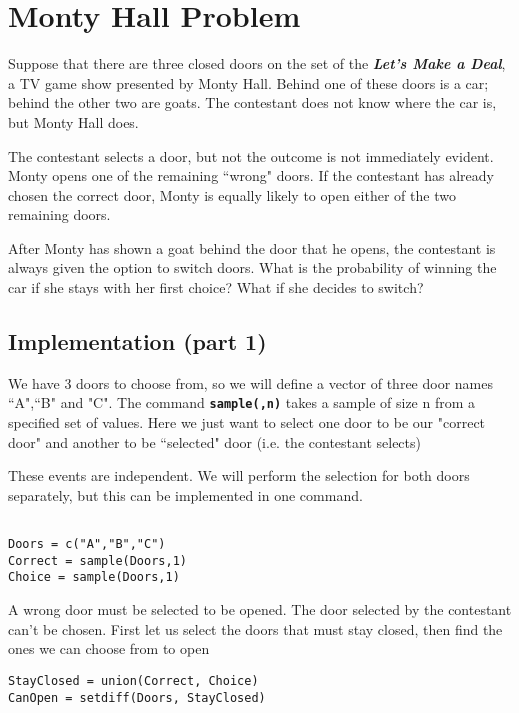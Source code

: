 \documentclass[a4paper,12pt]{article}
\begin{document}
\section{Monty Hall Problem}
Suppose that there are three closed doors on the set of the  \textbf{\emph{Let's Make a Deal}}, a TV game show presented by Monty Hall. Behind one of these doors is a car; behind the other two are goats. The contestant does not know where the car is, but Monty Hall does.

The contestant selects a door, but not the outcome is not immediately evident. Monty opens one of the remaining ``wrong" doors. If the contestant has already chosen the correct door, Monty is equally likely to open either of the two remaining doors.

After Monty has shown a goat behind the door that he opens, the contestant is always given the option to switch doors. What is the probability of winning the car if she stays with her first choice? What if she decides to switch?


\newpage
\subsection{Implementation (part 1)}
We have 3 doors to choose from, so we will define a vector of three door names ``A",``B" and "C". The command \texttt{\textbf{sample(,n)}} takes a sample of size n from a specified set of values. Here we just want to select one door to be our "correct door" and another to be ``selected" door (i.e. the contestant selects)

These events are independent. We will perform the selection for both doors separately, but this can be implemented in one command.


\begin{framed}
\begin{verbatim}

Doors = c("A","B","C")
Correct = sample(Doors,1)
Choice = sample(Doors,1)
\end{verbatim} 
\end{framed}

A wrong door must be selected to be opened. The door selected by the contestant can't be chosen. First let us select the doors that must stay closed, then find the ones we can choose from to open

\begin{framed}
\begin{verbatim}
StayClosed = union(Correct, Choice)
CanOpen = setdiff(Doors, StayClosed)
\end{verbatim} 
\end{framed}
\end{document}
